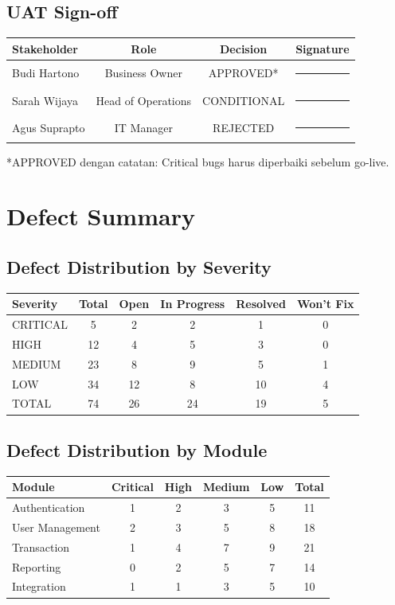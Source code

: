 \documentclass[12pt,a4paper]{article}
\begin{document}
\subsection{UAT Sign-off}
\begin{tabularx}{\textwidth}{@{}lccc@{}}
\toprule
Stakeholder & Role & Decision & Signature \\
\midrule
Budi Hartono & Business Owner & APPROVED* & \rule{3cm}{0.4pt} \\
Sarah Wijaya & Head of Operations & CONDITIONAL & \rule{3cm}{0.4pt} \\
Agus Suprapto & IT Manager & REJECTED & \rule{3cm}{0.4pt} \\
\bottomrule
\end{tabularx}

\smallskip
*APPROVED dengan catatan: Critical bugs harus diperbaiki sebelum go-live.

\section{Defect Summary}
\subsection{Defect Distribution by Severity}
\begin{tabularx}{\textwidth}{@{}lccccc@{}}
\toprule
Severity & Total & Open & In Progress & Resolved & Won't Fix \\
\midrule
CRITICAL & 5 & 2 & 2 & 1 & 0 \\
HIGH & 12 & 4 & 5 & 3 & 0 \\
MEDIUM & 23 & 8 & 9 & 5 & 1 \\
LOW & 34 & 12 & 8 & 10 & 4 \\
TOTAL & 74 & 26 & 24 & 19 & 5 \\
\bottomrule
\end{tabularx}

\subsection{Defect Distribution by Module}
\begin{tabularx}{\textwidth}{@{}lccccc@{}}
\toprule
Module & Critical & High & Medium & Low & Total \\
\midrule
Authentication & 1 & 2 & 3 & 5 & 11 \\
User Management & 2 & 3 & 5 & 8 & 18 \\
Transaction & 1 & 4 & 7 & 9 & 21 \\
Reporting & 0 & 2 & 5 & 7 & 14 \\
Integration & 1 & 1 & 3 & 5 & 10 \\
\bottomrule
\end{tabularx}
\end{document}

